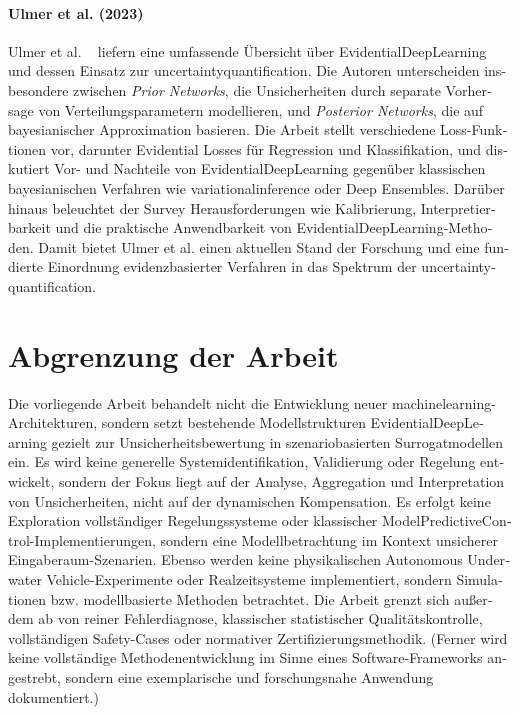 

\begin{otherlanguage}{ngerman}

\paragraph{Ulmer et al. (2023)}
Ulmer et al. ~\parencite{Ulmer2023} liefern eine umfassende Übersicht über \gls{EvidentialDeepLearning} und dessen Einsatz zur \gls{uncertaintyquantification}. Die Autoren unterscheiden insbesondere zwischen \emph{Prior Networks}, die Unsicherheiten durch separate Vorhersage von Verteilungsparametern modellieren, und \emph{Posterior Networks}, die auf bayesianischer Approximation basieren. Die Arbeit stellt verschiedene Loss-Funktionen vor, darunter Evidential Losses für Regression und Klassifikation, und diskutiert Vor- und Nachteile von \gls{EvidentialDeepLearning} gegenüber klassischen bayesianischen Verfahren wie \gls{variationalinference} oder Deep Ensembles. Darüber hinaus beleuchtet der Survey Herausforderungen wie Kalibrierung, Interpretierbarkeit und die praktische Anwendbarkeit von \gls{EvidentialDeepLearning}-Methoden. Damit bietet Ulmer et al. einen aktuellen Stand der Forschung und eine fundierte Einordnung evidenzbasierter Verfahren in das Spektrum der \gls{uncertaintyquantification}. 

\section{Abgrenzung der Arbeit}

Die vorliegende Arbeit behandelt nicht die Entwicklung neuer \gls{machinelearning}-Architekturen, sondern setzt bestehende Modellstrukturen \gls{EvidentialDeepLearning} gezielt zur Unsicherheitsbewertung in szenariobasierten Surrogatmodellen ein. Es wird keine generelle Systemidentifikation, Validierung oder Regelung entwickelt, sondern der Fokus liegt auf der Analyse, Aggregation und Interpretation von Unsicherheiten, nicht auf der dynamischen Kompensation.
Es erfolgt keine Exploration vollständiger Regelungssysteme oder klassischer \gls{ModelPredictiveControl}-Implementierungen, sondern eine Modellbetrachtung im Kontext unsicherer Eingaberaum-Szenarien. Ebenso werden keine physikalischen \gls{Autonomous Underwater Vehicle}-Experimente oder Realzeitsysteme implementiert, sondern Simulationen bzw. modellbasierte Methoden betrachtet. Die Arbeit grenzt sich außerdem ab von reiner Fehlerdiagnose, klassischer statistischer Qualitätskontrolle, vollständigen Safety-Cases oder normativer Zertifizierungsmethodik. (Ferner wird keine vollständige Methodenentwicklung im Sinne eines Software-Frameworks angestrebt, sondern eine exemplarische und forschungsnahe Anwendung dokumentiert.)

\end{otherlanguage}
